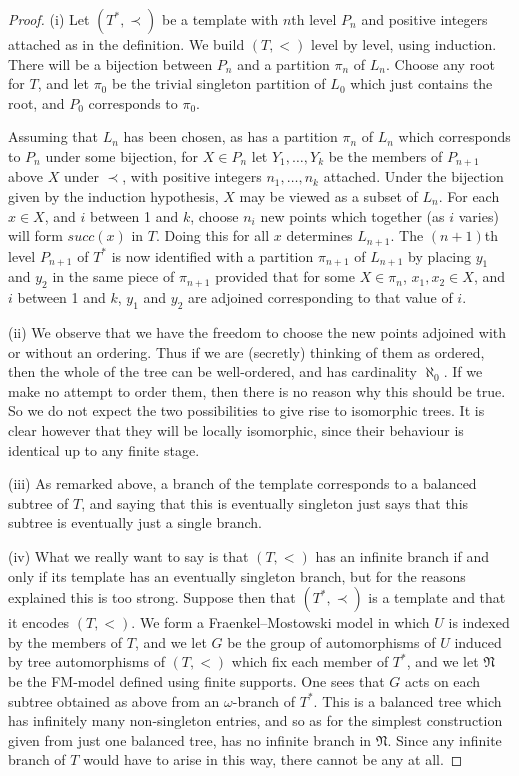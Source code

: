 \documentclass[a4paper,reqno]{amsart}
\numberwithin{equation}{section}
\begin{document}
\begin{proof} (i) Let $(T^*, \prec)$ be a template with $n$th level $P_n$ and positive integers attached as in the
definition. We build $(T,<)$ level by level, using induction. There will be a bijection between $P_n$ and a partition $\pi_n$ of
$L_n$. Choose any root for $T$, and let $\pi_0$ be the trivial singleton partition of $L_0$ which just contains the root, and
$P_0$ corresponds to $\pi_0$.

Assuming that $L_n$ has been chosen, as has a partition $\pi_n$ of $L_n$ which corresponds to $P_n$ under some bijection, for
$X \in P_n$ let $Y_1, \ldots, Y_k$ be the members of $P_{n+1}$ above $X$ under $\prec$, with positive integers $n_1, \ldots, n_k$
attached. Under the bijection given by the induction hypothesis, $X$ may be viewed as a subset of $L_n$. For each $x \in X$, and
$i$ between 1 and $k$, choose $n_i$ new points which together (as $i$ varies) will form $succ(x)$ in $T$. Doing this for all
$x$ determines $L_{n+1}$. The $(n+1)$th level $P_{n+1}$ of $T^*$ is now identified with a partition $\pi_{n+1}$ of $L_{n+1}$ by placing
$y_1$ and $y_2$ in the same piece of $\pi_{n+1}$ provided that for some $X \in \pi_n$, $x_1, x_2 \in X$, and $i$ between 1 and $k$,
$y_1$ and $y_2$ are adjoined corresponding to that value of $i$.

(ii) We observe that we have the freedom to choose the new points adjoined with or without an ordering. Thus if we are (secretly) 
thinking of them as ordered, then the whole of the tree can be well-ordered, and has cardinality $\aleph_0$. If we make no attempt
to order them, then there is no reason why this should be true. So we do not expect the two possibilities to give rise to 
isomorphic trees. It is clear however that they will be locally isomorphic, since their behaviour is identical up to any finite
stage.

(iii) As remarked above, a branch of the template corresponds to a balanced subtree of $T$, and saying that this is eventually singleton
just says that this subtree is eventually just a single branch.

(iv) What we really want to say is that $(T,<)$ has an infinite branch if and only if its template has an eventually singleton branch,
but for the reasons explained this is too strong. Suppose then that $(T^*, \prec)$ is a template and that it encodes $(T, <)$. We form
a Fraenkel--Mostowski model in which $U$ is indexed by the members of $T$, and we let $G$ be the group of automorphisms of $U$ induced by
tree automorphisms of $(T,<)$ which fix each member of $T^*$, and we let $\mathfrak N$ be the FM-model defined using finite supports.
One sees that $G$ acts on each subtree obtained as above from an $\omega$-branch of $T^*$. This is a balanced tree which has
infinitely many non-singleton entries, and so as for the simplest construction given from just one balanced tree, has no infinite
branch in $\mathfrak N$. Since any infinite branch of $T$ would have to arise in this way, there cannot be any at all. \end{proof}
\end{document}
